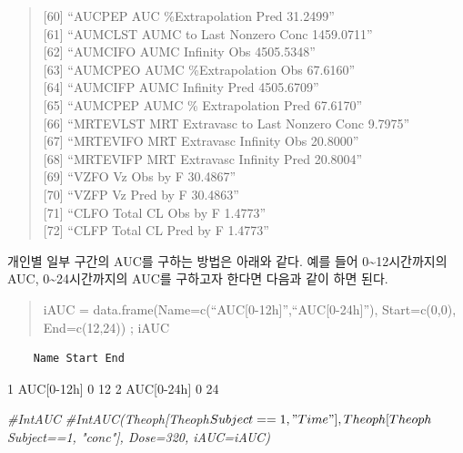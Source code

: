 \documentclass[12pt,]{krantz}
\newenvironment{Shaded}{\begin{snugshade}}{\end{snugshade}}
\newcommand{\CommentTok}[1]{\textcolor[rgb]{0.56,0.35,0.01}{\textit{#1}}}
\theoremstyle{definition}
\theoremstyle{definition}
\theoremstyle{definition}
\theoremstyle{remark}
\begin{document}
\begin{quote}
{[}60{]} ``AUCPEP AUC \%Extrapolation Pred 31.2499''\\
{[}61{]} ``AUMCLST AUMC to Last Nonzero Conc 1459.0711''\\
{[}62{]} ``AUMCIFO AUMC Infinity Obs 4505.5348''\\
{[}63{]} ``AUMCPEO AUMC \%Extrapolation Obs 67.6160''\\
{[}64{]} ``AUMCIFP AUMC Infinity Pred 4505.6709''\\
{[}65{]} ``AUMCPEP AUMC \% Extrapolation Pred 67.6170''\\
{[}66{]} ``MRTEVLST MRT Extravasc to Last Nonzero Conc 9.7975''\\
{[}67{]} ``MRTEVIFO MRT Extravasc Infinity Obs 20.8000''\\
{[}68{]} ``MRTEVIFP MRT Extravasc Infinity Pred 20.8004''\\
{[}69{]} ``VZFO Vz Obs by F 30.4867''\\
{[}70{]} ``VZFP Vz Pred by F 30.4863''\\
{[}71{]} ``CLFO Total CL Obs by F 1.4773''\\
{[}72{]} ``CLFP Total CL Pred by F 1.4773''
\end{quote}

개인별 일부 구간의 AUC를 구하는 방법은 아래와 같다. 예를 들어
0\textasciitilde{}12시간까지의 AUC, 0\textasciitilde{}24시간까지의 AUC를
구하고자 한다면 다음과 같이 하면 된다.

\begin{quote}
iAUC = data.frame(Name=c(``AUC{[}0-12h{]}'',``AUC{[}0-24h{]}''),
Start=c(0,0), End=c(12,24)) ; iAUC
\end{quote}

\begin{verbatim}
    Name Start End
\end{verbatim}

1 AUC{[}0-12h{]} 0 12 2 AUC{[}0-24h{]} 0 24

\begin{Shaded}
\begin{Highlighting}[]
\CommentTok{#IntAUC}
\CommentTok{#IntAUC(Theoph[Theoph$Subject==1,"Time"], Theoph[Theoph$Subject==1, "conc"], Dose=320, iAUC=iAUC)}
\end{Highlighting}
\end{Shaded}
\end{document}
